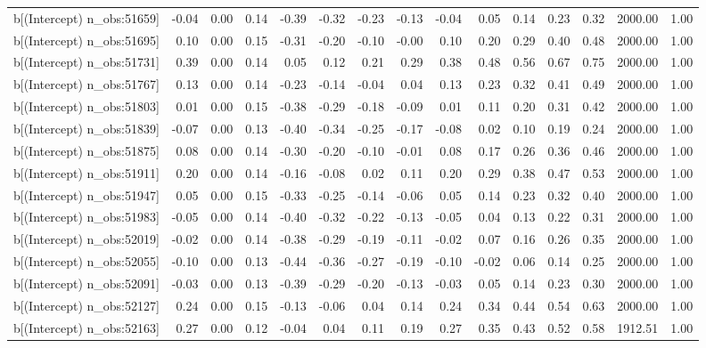 \begin{table}[ht]
\begin{tabular}{rrrrrrrrrrrrrrr}
  b[(Intercept) n\_obs:51659] & -0.04 & 0.00 & 0.14 & -0.39 & -0.32 & -0.23 & -0.13 & -0.04 & 0.05 & 0.14 & 0.23 & 0.32 & 2000.00 & 1.00 \\ 
  b[(Intercept) n\_obs:51695] & 0.10 & 0.00 & 0.15 & -0.31 & -0.20 & -0.10 & -0.00 & 0.10 & 0.20 & 0.29 & 0.40 & 0.48 & 2000.00 & 1.00 \\ 
  b[(Intercept) n\_obs:51731] & 0.39 & 0.00 & 0.14 & 0.05 & 0.12 & 0.21 & 0.29 & 0.38 & 0.48 & 0.56 & 0.67 & 0.75 & 2000.00 & 1.00 \\ 
  b[(Intercept) n\_obs:51767] & 0.13 & 0.00 & 0.14 & -0.23 & -0.14 & -0.04 & 0.04 & 0.13 & 0.23 & 0.32 & 0.41 & 0.49 & 2000.00 & 1.00 \\ 
  b[(Intercept) n\_obs:51803] & 0.01 & 0.00 & 0.15 & -0.38 & -0.29 & -0.18 & -0.09 & 0.01 & 0.11 & 0.20 & 0.31 & 0.42 & 2000.00 & 1.00 \\ 
  b[(Intercept) n\_obs:51839] & -0.07 & 0.00 & 0.13 & -0.40 & -0.34 & -0.25 & -0.17 & -0.08 & 0.02 & 0.10 & 0.19 & 0.24 & 2000.00 & 1.00 \\ 
  b[(Intercept) n\_obs:51875] & 0.08 & 0.00 & 0.14 & -0.30 & -0.20 & -0.10 & -0.01 & 0.08 & 0.17 & 0.26 & 0.36 & 0.46 & 2000.00 & 1.00 \\ 
  b[(Intercept) n\_obs:51911] & 0.20 & 0.00 & 0.14 & -0.16 & -0.08 & 0.02 & 0.11 & 0.20 & 0.29 & 0.38 & 0.47 & 0.53 & 2000.00 & 1.00 \\ 
  b[(Intercept) n\_obs:51947] & 0.05 & 0.00 & 0.15 & -0.33 & -0.25 & -0.14 & -0.06 & 0.05 & 0.14 & 0.23 & 0.32 & 0.40 & 2000.00 & 1.00 \\ 
  b[(Intercept) n\_obs:51983] & -0.05 & 0.00 & 0.14 & -0.40 & -0.32 & -0.22 & -0.13 & -0.05 & 0.04 & 0.13 & 0.22 & 0.31 & 2000.00 & 1.00 \\ 
  b[(Intercept) n\_obs:52019] & -0.02 & 0.00 & 0.14 & -0.38 & -0.29 & -0.19 & -0.11 & -0.02 & 0.07 & 0.16 & 0.26 & 0.35 & 2000.00 & 1.00 \\ 
  b[(Intercept) n\_obs:52055] & -0.10 & 0.00 & 0.13 & -0.44 & -0.36 & -0.27 & -0.19 & -0.10 & -0.02 & 0.06 & 0.14 & 0.25 & 2000.00 & 1.00 \\ 
  b[(Intercept) n\_obs:52091] & -0.03 & 0.00 & 0.13 & -0.39 & -0.29 & -0.20 & -0.13 & -0.03 & 0.05 & 0.14 & 0.23 & 0.30 & 2000.00 & 1.00 \\ 
  b[(Intercept) n\_obs:52127] & 0.24 & 0.00 & 0.15 & -0.13 & -0.06 & 0.04 & 0.14 & 0.24 & 0.34 & 0.44 & 0.54 & 0.63 & 2000.00 & 1.00 \\ 
  b[(Intercept) n\_obs:52163] & 0.27 & 0.00 & 0.12 & -0.04 & 0.04 & 0.11 & 0.19 & 0.27 & 0.35 & 0.43 & 0.52 & 0.58 & 1912.51 & 1.00 \\ 

\end{tabular}
\end{table}
